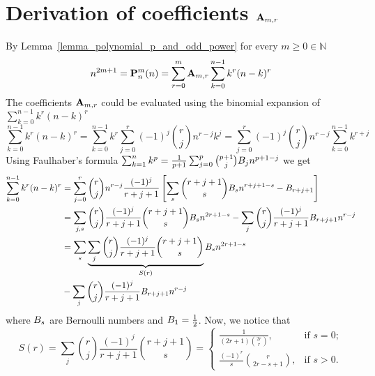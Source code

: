 \documentclass[12pt,letterpaper,oneside,reqno]{amsart}
\newcommand \bernoulli [2][B] {{#1}\sb{#2}}
\newcommand \coeffA [3][A] {{\mathbf{#1}} \sb{#2,#3}}
\newcommand \polynomialP [4][P]{{\mathbf{#1}}\sp{#2} \sb{#3}(#4)}
\numberwithin{equation}{section}
\begin{document}
    \section{Derivation of coefficients \texorpdfstring{$\coeffA{m}{r}$}{A[m,r]}}
    By Lemma~\ref{lemma_polynomial_p_and_odd_power} for every $m \geq 0 \in\mathbb{N}$
    \begin{equation*}
        n^{2m+1} = \polynomialP{m}{n}{n} = \sum_{r=0}^{m} \coeffA{m}{r} \sum_{k=0}^{n-1} k^r (n-k)^r
    \end{equation*}
    The coefficients $\coeffA{m}{r}$ could be evaluated using the binomial expansion of $\sum_{k=0}^{n-1} k^r (n-k)^r$
    \begin{equation*}
        \sum_{k=0}^{n-1} k^r (n-k)^r
        =\sum_{k=0}^{n-1} k^r \sum_{j=0}^{r} (-1)^j \binom{r}{j} n^{r-j} k^{j}
        =\sum_{j=0}^{r} (-1)^j \binom{r}{j} n^{r-j} \sum_{k=0}^{n-1} k^{r+j}
    \end{equation*}
    Using Faulhaber's formula $\sum _{k=1}^{n} k^{p} = \frac{1}{p+1}\sum _{j=0}^{p} \binom{p+1}{j}
    \bernoulli{j} n^{p+1-j}$ we get
    \begin{equation}
        \label{proof1}
        \begin{split}
            \sum_{k=0}^{n-1} k^r (n-k)^r
            &=\sum_{j=0}^{r} \binom{r}{j} n^{r-j} \frac{(-1)^j}{r+j+1}
            \left[\sum_{s} \binom{r+j+1}{s} \bernoulli{s} n^{r+j+1-s} - \bernoulli{r+j+1} \right] \\
            &=\sum_{j,s} \binom{r}{j} \frac{(-1)^j}{r+j+1} \binom{r+j+1}{s} \bernoulli{s} n^{2r+1-s}
            -\sum_{j} \binom{r}{j} \frac{(-1)^j}{r+j+1} \bernoulli{r+j+1} n^{r-j} \\
            &=\sum_{s} \underbrace{\sum_{j} \binom{r}{j} \frac{(-1)^j}{r+j+1} \binom{r+j+1}{s}}_{S(r)}
            \bernoulli{s} n^{2r+1-s} \\
            &-\sum_{j} \binom{r}{j} \frac{(-1)^j}{r+j+1} \bernoulli{r+j+1} n^{r-j}
        \end{split}
    \end{equation}
    where $\bernoulli{s}$ are Bernoulli numbers and $\bernoulli{1}=\frac{1}{2}$.
    Now, we notice that
    \begin{equation*}
        S(r) = \sum_{j} \binom{r}{j} \frac{(-1)^j}{r+j+1} \binom{r+j+1}{s}
        =\begin{cases}
             \frac{1}{(2r+1) \binom{2r}r}, & \text{if } s=0;\\
             \frac{(-1)^r}{s} \binom{r}{2r-s+1}, & \text{if } s>0.
        \end{cases}
    \end{equation*}
\end{document}
